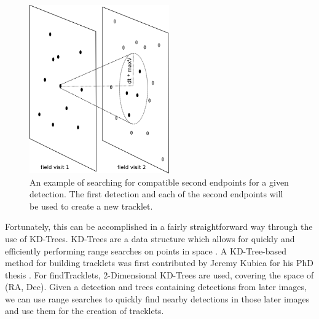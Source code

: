 \begin{figure}[ht!]
  \centering
    \includegraphics[width=6cm]{illustrations/findTracklets-onequery.png}
    \caption{ An example of searching for compatible second endpoints
      for a given detection.  The first detection and each of the
      second endpoints will be used to create a new tracklet.}
\label{findTrackletsIllustrated}
\end{figure}


Fortunately, this can be
accomplished in a fairly straightforward way through the use of
KD-Trees.  KD-Trees are a data structure which allows for quickly and
efficiently performing range searches on points in space
\citep{bentley_kdtrees}.  A KD-Tree-based method for building
tracklets was first contributed by Jeremy Kubica for his PhD thesis
\citep{kubica_thesis}.  For findTracklets, 2-Dimensional KD-Trees are
used, covering the space of (RA, Dec).  Given a detection and trees
containing detections from later images, we can use range searches to
quickly find nearby detections in those later images and use them for
the creation of tracklets.

